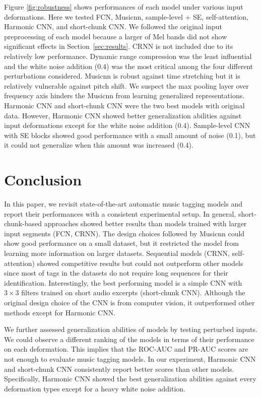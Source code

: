 \documentclass{article}
\begin{document}
Figure \ref{fig:robustness} shows performances of each model under various input deformations. Here we tested FCN, Musicnn, sample-level + SE, self-attention, Harmonic CNN, and short-chunk CNN. We followed the original input preprocessing of each model because a larger of Mel bands did not show significant effects in Section~\ref{sec:results}. CRNN is not included due to its relatively low performance. Dynamic range compression was the least influential and the white noise addition (0.4) was the most critical among the four different perturbations considered. Musicnn is robust against time stretching but it is relatively vulnerable against pitch shift. We suspect the max pooling layer over frequency axis hinders the Musicnn from learning generalized representations. Harmonic CNN and short-chunk CNN were the two best models with original data. However, Harmonic CNN showed better generalization abilities against input deformations except for the white noise addition (0.4). Sample-level CNN with SE blocks showed good performance with a small amount of noise (0.1), but it could not generalize when this amount was increased (0.4). \section{Conclusion}\label{sec:conclusion}
In this paper, we revisit state-of-the-art automatic music tagging models and report their performances with a consistent experimental setup. 
In general, short-chunk-based approaches showed better results than models trained with larger input segments (FCN, CRNN). The design choices followed by Musicnn could show good performance on a small dataset, but it restricted the model from learning more information on larger datasets.
Sequential models (CRNN, self-attention) showed competitive results but could not outperform other models since most of tags in the datasets do not require long sequences for their identification. Interestingly, the best performing model is a simple CNN with $3 \times 3$ filters trained on short audio excerpts (short-chunk CNN). Although the original design choice of the CNN is from computer vision, it outperformed other methods except for Harmonic CNN.

We further assessed generalization abilities of models by testing perturbed inputs. We could observe a different ranking of the models in terms of their performance on each deformation. This implies that the ROC-AUC and PR-AUC scores are not enough to evaluate music tagging models. In our experiment, Harmonic CNN and short-chunk CNN consistently report better scores than other models. Specifically, Harmonic CNN showed the best generalization abilities against every deformation types except for a heavy white noise addition. 
\end{document}
